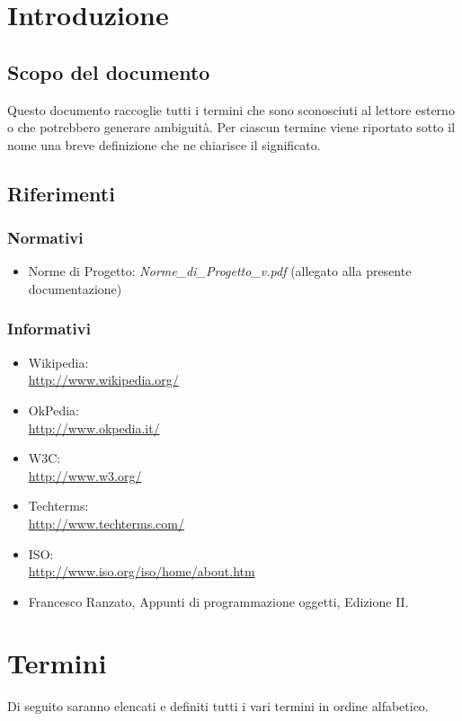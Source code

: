 \newpage
\section{Introduzione}%
\label{1.0}
\subsection{Scopo del documento}%
\label{1.1}
Questo documento raccoglie tutti i termini che sono sconosciuti al lettore esterno o che potrebbero generare ambiguità. Per ciascun termine viene riportato sotto il nome una breve definizione che ne chiarisce il significato.
\subsection{Riferimenti} %
\label{1.4}
\subsubsection{Normativi} %
\label{1.4.1}
\begin{itemize}
\item Norme di Progetto: \emph{Norme\_{}di\_{}Progetto\_{}v\versioneNormeDiProgetto{}.pdf}  (allegato alla presente documentazione)\\
\end{itemize}
\subsubsection{Informativi} %
\label{1.4.2}
\begin{itemize}
\item Wikipedia:\\ \url{ http://www.wikipedia.org/}
\item OkPedia:\\ \url{ http://www.okpedia.it/}
\item W3C:\\ \url{http://www.w3.org/}
\item Techterms:\\ \url{http://www.techterms.com/}
\item ISO:\\ \url{http://www.iso.org/iso/home/about.htm}
\item Francesco Ranzato, Appunti di programmazione oggetti, Edizione II.\\
\end{itemize}

\newpage
\section{Termini}
Di seguito saranno elencati e definiti tutti i vari termini in ordine alfabetico.







